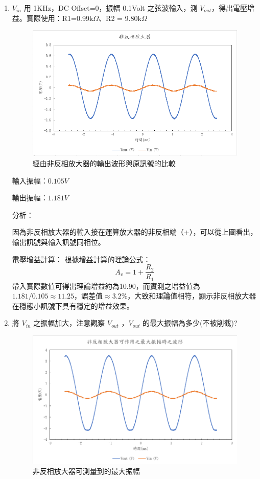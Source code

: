 \documentclass[12pt,a4paper]{article}
\begin{document}
\begin{CJK}{UTF8}{bkai}
\begin{enumerate}
    \item $V_{in}$ 用 1KHz，DC Offset=0，振幅 0.1Volt 之弦波輸入，測 $V_{out}$，得出電壓增益。實際使用：R1=0.99k$\Omega$、R2 = 9.80k$\Omega$
    
\begin{figure}[h]
    \centering
    \includegraphics[width=0.7\linewidth]{figures/non-ia/non-inverting amplifier.png}
    \caption{經由非反相放大器的輸出波形與原訊號的比較}
    \label{fig:non_IA_normal}
\end{figure}

輸入振幅：$0.105V$

輸出振幅：$1.181V$

\noindent 分析：

因為非反相放大器的輸入接在運算放大器的非反相端（+），可以從上圖看出，輸出訊號與輸入訊號同相位。

\noindent 電壓增益計算：
根據增益計算的理論公式：
\begin{equation}
    A_v = 1+\frac{R_2}{R_1}
\end{equation}
帶入實際數值可得出理論增益約為10.90，而實測之增益值為$1.181/0.105 \approx 11.25$，誤差值$\approx3.2\%$，大致和理論值相符，顯示非反相放大器在穩態小訊號下具有穩定的增益效果。

\clearpage
\item 將 $V_{in}$ 之振幅加大，注意觀察 $V_{out}$ ，$V_{out}$ 的最大振幅為多少(不被削截)?
\begin{figure}[h]
    \centering
    \includegraphics[width=0.7\linewidth]{figures/non-ia/non-inverting amplifier_max.png}
    \caption{非反相放大器可測量到的最大振幅}
    \label{fig:non_IA_Max}
\end{figure}


\end{enumerate}
\end{CJK}
\end{document}

